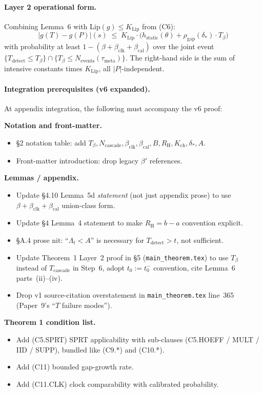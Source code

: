 \documentclass{article}
\newcommand{\deltastar}{\delta_{*}}
\newcommand{\rhogap}{\rho_{\mathrm{gap}}}
\newcommand{\Pproxy}{P}
\newcommand{\Ttruth}{T}
\newcommand{\Tbeta}{T_{\beta}}
\newcommand{\Ncasc}{N_{\mathrm{cascade}}}
\newcommand{\Nev}{N_{\mathrm{events}}}
\newcommand{\bclk}{\beta_{\mathrm{clk}}}
\newcommand{\bcal}{\beta_{\mathrm{cal}}}
\newcommand{\Bclip}{B}
\newcommand{\Rh}{R_{\mathrm{H}}}
\newcommand{\Kch}{K_{\mathrm{ch}}}
\begin{document}
\paragraph{Layer 2 operational form.}
Combining Lemma~6 with $\mathrm{Lip}(g) \leq K_{\mathrm{Lip}}$ from
(C6):
\[
  |g(\Ttruth) - g(\Pproxy)|(s) \;\leq\; K_{\mathrm{Lip}} \cdot
  \bigl(h_{\mathrm{static}}(\theta) + \rhogap(\deltastar) \cdot
  \Tbeta\bigr)
\]
with probability at least $1 - (\beta + \bclk + \bcal)$ over the
joint event $\{T_{\mathrm{detect}} \leq \Tbeta\} \cap \{\Tbeta \leq
\Nev(\tau_{\mathrm{meta}})\}$.  The right-hand side is the sum of
intensive constants times $K_{\mathrm{Lip}}$, all $|P|$-independent.

\paragraph{Integration prerequisites (v6 expanded).}
At appendix integration, the following must accompany the v6 proof:

\textbf{Notation and front-matter.}
\begin{itemize}
\item §2 notation table: add $\Tbeta, \Ncasc, \bclk, \bcal, \Bclip,
  \Rh, \Kch, \deltastar, A$.
\item Front-matter introduction: drop legacy $\beta'$ references.
\end{itemize}

\textbf{Lemmas / appendix.}
\begin{itemize}
\item Update §4.10 Lemma~5d \emph{statement} (not just appendix
  prose) to use $\beta + \bclk + \bcal$ union-class form.
\item Update §4 Lemma~4 statement to make $\Rh = b - a$ convention
  explicit.
\item §A.4 prose nit: ``$\Lambda_t < A$'' is necessary for
  $T_{\mathrm{detect}} > t$, not sufficient.
\item Update Theorem~1 Layer~2 proof in §5
  (\texttt{main\_theorem.tex}) to use $\Tbeta$ instead of
  $T_{\mathrm{cascade}}$ in Step~6, adopt $t_0 := t_0^-$
  convention, cite Lemma~6 parts~(ii)--(iv).
\item Drop v1 source-citation overstatement in
  \texttt{main\_theorem.tex} line~365 (Paper~9's ``$T$ failure
  modes'').
\end{itemize}

\textbf{Theorem 1 condition list.}
\begin{itemize}
\item Add (C5.SPRT) SPRT applicability with sub-clauses
  (C5.HOEFF / MULT / IID / SUPP), bundled like (C9.*) and (C10.*).
\item Add (C11) bounded gap-growth rate.
\item Add (C11.CLK) clock comparability with calibrated
  probability.
\end{itemize}
\end{document}

